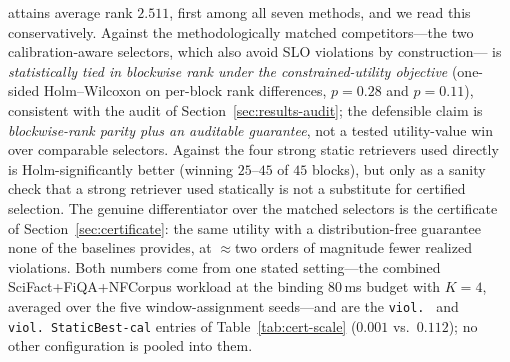 \begin{table}[t]
\centering
\caption{Average rank (lower is better) over $45$ blocks on SciFact+FiQA+NFCorpus with real external operators. \CWC{} is rank-1 and significantly beats all four SOTA operators under a one-sided Holm-corrected Wilcoxon test; it is statistically tied with the two calibration-aware selectors. ``Win blocks'' is the number of blocks (out of $45$) in which \CWC{} has strictly higher mean constrained utility than the baseline in that row.}
\label{tab:rank}
\end{table}

\CWC{} attains average rank $2.511$, first among all seven methods, and we read this conservatively. Against the methodologically matched competitors---the two calibration-aware selectors, which also avoid SLO violations by construction---\CWC{} is \emph{statistically tied in blockwise rank under the constrained-utility objective} (one-sided Holm--Wilcoxon on per-block rank differences, $p{=}0.28$ and $p{=}0.11$), consistent with the audit of Section~\ref{sec:results-audit}; the defensible claim is \emph{blockwise-rank parity plus an auditable guarantee}, not a tested utility-value win over comparable selectors. Against the four strong static retrievers used directly \CWC{} is Holm-significantly better (winning $25$--$45$ of $45$ blocks), but only as a sanity check that a strong retriever used statically is not a substitute for certified selection. The genuine differentiator over the matched selectors is the certificate of Section~\ref{sec:certificate}: the same utility with a distribution-free guarantee none of the baselines provides, at $\approx$two orders of magnitude fewer realized violations. Both numbers come from one stated setting---the combined SciFact+FiQA+NFCorpus workload at the binding $80$\,ms budget with $K{=}4$, averaged over the five window-assignment seeds---and are the \texttt{viol.\ \CWC{}} and \texttt{viol.\ StaticBest-cal} entries of Table~\ref{tab:cert-scale} ($0.001$ vs.\ $0.112$); no other configuration is pooled into them.

